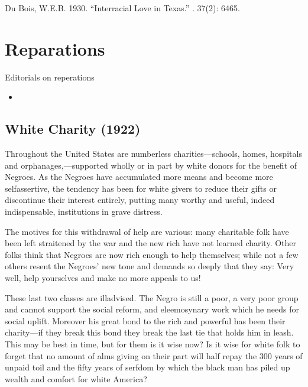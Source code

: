 \documentclass[letterpaper,10pt,english]{jupyterBook}
\begin{document}
\sphinxAtStartPar
{} Du Bois, W.E.B. 1930. “Interracial Love in Texas.” . 37(2): 64\sphinxhyphen{}65.


\section{Reparations}
\label{\detokenize{Sections/reparations:reparations}}\label{\detokenize{Sections/reparations::doc}}
\sphinxAtStartPar
Editorials on reperations
\begin{itemize}
\item {} 
\sphinxAtStartPar
{\hyperref[\detokenize{Volumes/24/02/whitecharity::doc}]{}}

\end{itemize}


\subsection{White Charity (1922)}
\label{\detokenize{Volumes/24/02/whitecharity:white-charity-1922}}\label{\detokenize{Volumes/24/02/whitecharity::doc}}
\sphinxAtStartPar
Throughout the United States are numberless charities—schools, homes, hospitals and orphanages,—supported wholly or in part by white donors for the benefit of Negroes. As the Negroes have accumulated more means and become more self\sphinxhyphen{}assertive, the tendency has been for white givers to reduce their gifts or discontinue their interest entirely, putting many worthy and useful, indeed indispensable, institutions in grave distress.

\sphinxAtStartPar
The motives for this withdrawal of help are various: many charitable folk have been left straitened by the war and the new rich have not learned charity. Other folks think that Negroes are now rich enough to help themselves; while not a few others resent the Negroes’ new tone and demands so deeply that they say: Very well, help yourselves and make no more appeals to us!

\sphinxAtStartPar
These last two classes are ill\sphinxhyphen{}advised. The Negro is still a poor, a very poor group and cannot support the social reform, and eleemosynary work which he needs for social uplift. Moreover his great bond to the rich and powerful has been their charity—if they break this bond they break the last tie that holds him in leash. This may be best in time, but for them is it wise now? Is it wise for white folk to forget that no amount of alms­ giving on their part will half repay the 300 years of unpaid toil and the fifty years of serfdom by which the black man has piled up wealth and comfort for white America?
\end{document}
